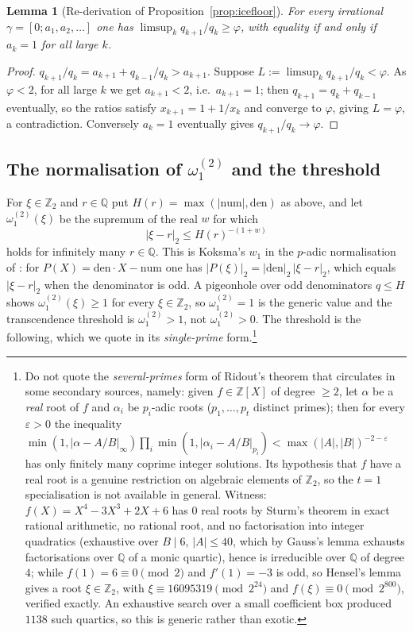 \documentclass[11pt,reqno]{amsart}
\theoremstyle{plain}
\newtheorem{lemma}[theorem]{Lemma}
\theoremstyle{definition}
\newcommand{\Z}{\mathbb{Z}}
\newcommand{\Q}{\mathbb{Q}}
\newcommand{\Zt}{\Z_2}
\newcommand{\om}{\omega_1^{(2)}}
\begin{document}
\begin{lemma}[Re-derivation of Proposition~\ref{prop:icefloor}]\label{lem:phifloor}
For every irrational $\gamma=[0;a_1,a_2,\dots]$ one has $\limsup_k q_{k+1}/q_k\ge\varphi$, with
equality if and only if $a_k=1$ for all large $k$.
\end{lemma}

\begin{proof}
$q_{k+1}/q_k=a_{k+1}+q_{k-1}/q_k>a_{k+1}$. Suppose $L:=\limsup_k q_{k+1}/q_k<\varphi$. As
$\varphi<2$, for all large $k$ we get $a_{k+1}<2$, i.e.\ $a_{k+1}=1$; then $q_{k+1}=q_k+q_{k-1}$
eventually, so the ratios satisfy $x_{k+1}=1+1/x_k$ and converge to $\varphi$, giving $L=\varphi$, a
contradiction. Conversely $a_k=1$ eventually gives $q_{k+1}/q_k\to\varphi$.
\end{proof}

\subsection{The normalisation of \texorpdfstring{$\om$}{omega} and the threshold}\label{ss:norm}
For $\xi\in\Zt$ and $r\in\Q$ put $H(r)=\max(|\mathrm{num}|,\mathrm{den})$ as above, and let
$\om(\xi)$ be the supremum of the real $w$ for which
\begin{equation}\label{eq:omdef}
  |\xi-r|_2\le H(r)^{-(1+w)}
\end{equation}
holds for infinitely many $r\in\Q$. This is Koksma's $w_1$ in the $p$-adic normalisation of
\cite[Ch.~9]{Bugeaud04}: for $P(X)=\mathrm{den}\cdot X-\mathrm{num}$ one has
$|P(\xi)|_2=|\mathrm{den}|_2\,|\xi-r|_2$, which equals $|\xi-r|_2$ when the denominator is odd. A
pigeonhole over odd denominators $q\le H$ shows $\om(\xi)\ge1$ for every $\xi\in\Zt$, so
$\om=1$ is the generic value and the transcendence threshold is $\om>1$, not $\om>0$. The threshold
is the following, which we quote in its \emph{single-prime} form.\footnote{Do not quote the
\emph{several-primes} form of Ridout's theorem that circulates in some secondary sources, namely:
given $f\in\Z[X]$ of degree $\ge2$, let $\alpha$ be a \emph{real} root of $f$ and $\alpha_i$ be
$p_i$-adic roots ($p_1,\dots,p_t$ distinct primes); then for every $\varepsilon>0$ the inequality
$\min(1,|\alpha-A/B|_\infty)\prod_i\min(1,|\alpha_i-A/B|_{p_i})<\max(|A|,|B|)^{-2-\varepsilon}$ has
only finitely many coprime integer solutions. Its hypothesis that $f$ have a real root is a genuine
restriction on algebraic elements of $\Zt$, so the $t=1$ specialisation is not available in general.
Witness: $f(X)=X^{4}-3X^{3}+2X+6$ has $0$ real roots by Sturm's theorem in exact rational
arithmetic, no rational root, and no factorisation into integer quadratics (exhaustive over
$B\mid6$, $|A|\le40$, which by Gauss's lemma exhausts factorisations over $\Q$ of a monic quartic),
hence is irreducible over $\Q$ of degree $4$; while $f(1)=6\equiv0\pmod 2$ and $f'(1)=-3$ is odd, so
Hensel's lemma gives a root $\xi\in\Zt$, with $\xi\equiv16095319\pmod{2^{24}}$ and
$f(\xi)\equiv0\pmod{2^{800}}$, verified exactly. An exhaustive search over a small coefficient box
produced $1138$ such quartics, so this is generic rather than exotic.}
\end{document}
